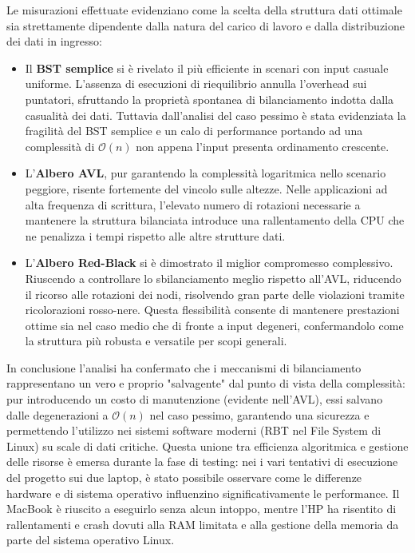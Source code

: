 \documentclass[10pt]{article}
\begin{document}
Le misurazioni effettuate evidenziano come la scelta della struttura dati ottimale sia strettamente dipendente dalla natura del carico di lavoro e dalla distribuzione dei dati in ingresso:
\begin{itemize}
    \item Il \textbf{BST semplice} si è rivelato il più efficiente in scenari con input casuale uniforme. L'assenza di esecuzioni di riequilibrio annulla l'overhead sui puntatori, sfruttando la proprietà spontanea di bilanciamento indotta dalla casualità dei dati. Tuttavia dall'analisi del caso pessimo è stata evidenziata la fragilità del BST semplice e un calo di performance portando ad una complessità di $\mathcal{O}(n)$ non appena l'input presenta ordinamento crescente.
    \item L'\textbf{Albero AVL}, pur garantendo la complessità logaritmica nello scenario peggiore, risente fortemente del vincolo sulle altezze. Nelle applicazioni ad alta frequenza di scrittura, l'elevato numero di rotazioni necessarie a mantenere la struttura bilanciata introduce una rallentamento della CPU che ne penalizza i tempi rispetto alle altre strutture dati.
    \item L'\textbf{Albero Red-Black} si è dimostrato il miglior compromesso complessivo. Riuscendo a controllare lo sbilanciamento meglio rispetto all'AVL, riducendo il ricorso alle rotazioni dei nodi, risolvendo gran parte delle violazioni tramite ricolorazioni rosso-nere. Questa flessibilità consente di mantenere prestazioni ottime sia nel caso medio che di fronte a input degeneri, confermandolo come la struttura più robusta e versatile per scopi generali.
\end{itemize}

In conclusione l'analisi ha confermato che i meccanismi di bilanciamento rappresentano un vero e proprio "salvagente" dal punto di vista della complessità: pur introducendo un costo di manutenzione (evidente nell'AVL), essi salvano dalle degenerazioni a $\mathcal{O}(n)$ nel caso pessimo, garantendo una sicurezza e permettendo l'utilizzo nei sistemi software moderni (RBT nel File System di Linux) su scale di dati critiche. Questa unione tra efficienza algoritmica e gestione delle risorse è emersa durante la fase di testing: nei i vari tentativi di esecuzione del progetto sui due laptop, è stato possibile osservare come le differenze hardware e di sistema operativo influenzino significativamente le performance. Il MacBook è riuscito a eseguirlo senza alcun intoppo, mentre l'HP ha risentito di rallentamenti e crash dovuti alla RAM limitata e alla gestione della memoria da parte del sistema operativo Linux.
\end{document}
